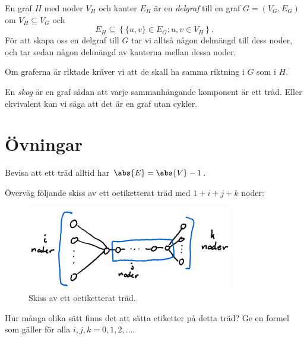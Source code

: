 \documentclass[nobib]{tufte-handout}
\begin{document}
\begin{definition}
    En graf $H$ med noder $V_H$ och kanter $E_H$ är en \emph{delgraf} till en graf $G = (V_G, E_G)$ om $V_H\subseteq V_G$ och 
    $$E_H \subseteq \left\{\{u,v\} \in E_G: u, v \in V_H\right\}.$$
    För att skapa oss en delgraf till $G$ tar vi alltså någon delmängd till dess noder, och tar sedan någon delmängd av kanterna mellan dessa noder.

    Om graferna är riktade kräver vi att de skall ha samma riktning i $G$ som i $H$.
\end{definition}

\begin{definition}
    En \emph{skog} är en graf sådan att varje sammanhängande komponent är ett träd. Eller ekvivalent kan vi säga att det är en graf utan cykler.
\end{definition}

\section{Övningar}

\begin{xca}
    Bevisa att ett träd alltid har $\abs{E} = \abs{V} - 1$.
\end{xca}

\begin{xca}
    Överväg följande skiss av ett oetiketterat träd med $1 + i + j + k$ noder:
    \begin{figure}
        \centering
        \includegraphics[width=0.8\textwidth]{graphics/exercise_label_unlabelled_tree.png}
        \caption{Skiss av ett oetiketterat träd.}
    \end{figure}

    Hur många olika sätt finns det att sätta etiketter på detta träd? Ge en formel som gäller för alla $i, j, k = 0, 1, 2,\ldots$.
\end{xca}
\end{document}
